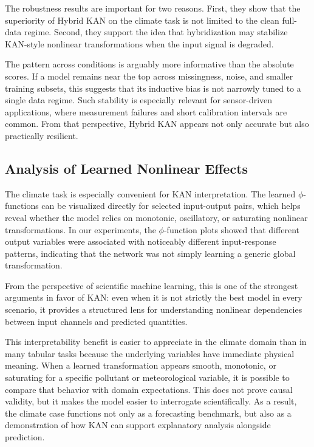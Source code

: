\documentclass[10pt,conference,onecolumn]{IEEEtran}
\begin{document}
The robustness results are important for two reasons. First, they show that the superiority of Hybrid KAN on the climate task is not limited to the clean full-data regime. Second, they support the idea that hybridization may stabilize KAN-style nonlinear transformations when the input signal is degraded.

The pattern across conditions is arguably more informative than the absolute scores. If a model remains near the top across missingness, noise, and smaller training subsets, this suggests that its inductive bias is not narrowly tuned to a single data regime. Such stability is especially relevant for sensor-driven applications, where measurement failures and short calibration intervals are common. From that perspective, Hybrid KAN appears not only accurate but also practically resilient.

\subsection{Analysis of Learned Nonlinear Effects}

The climate task is especially convenient for KAN interpretation. The learned $\phi$-functions can be visualized directly for selected input-output pairs, which helps reveal whether the model relies on monotonic, oscillatory, or saturating nonlinear transformations. In our experiments, the $\phi$-function plots showed that different output variables were associated with noticeably different input-response patterns, indicating that the network was not simply learning a generic global transformation.

From the perspective of scientific machine learning, this is one of the strongest arguments in favor of KAN: even when it is not strictly the best model in every scenario, it provides a structured lens for understanding nonlinear dependencies between input channels and predicted quantities.

This interpretability benefit is easier to appreciate in the climate domain than in many tabular tasks because the underlying variables have immediate physical meaning. When a learned transformation appears smooth, monotonic, or saturating for a specific pollutant or meteorological variable, it is possible to compare that behavior with domain expectations. This does not prove causal validity, but it makes the model easier to interrogate scientifically. As a result, the climate case functions not only as a forecasting benchmark, but also as a demonstration of how KAN can support explanatory analysis alongside prediction.
\end{document}
